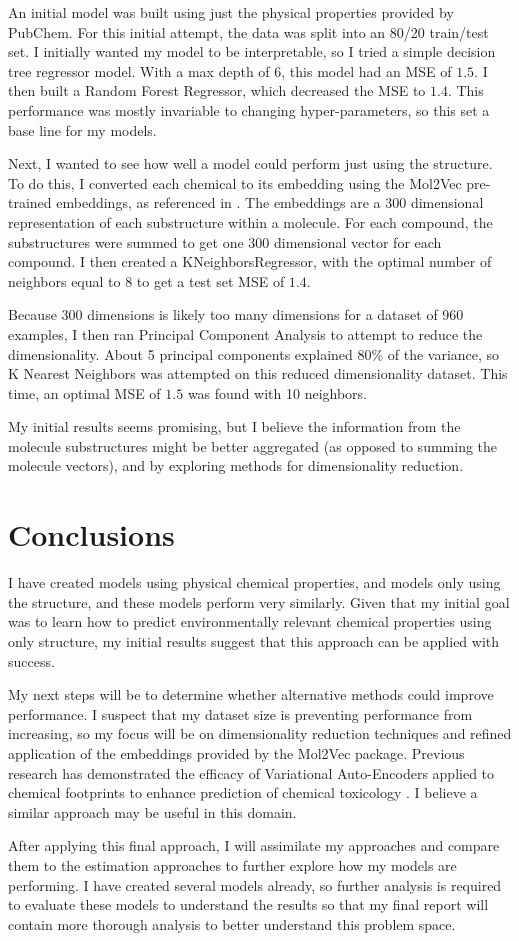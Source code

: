 \documentclass[12pt, oneside]{article}   	%
\begin{document}
An initial model was built using just the physical properties provided by PubChem. For this initial attempt, the data was split into an 80/20 train/test set. I initially wanted my model to be interpretable, so I tried a simple decision tree regressor model. With a max depth of 6, this model had an MSE of $1.5$. I then built a Random Forest Regressor, which decreased the MSE to $1.4$. This performance was mostly invariable to changing hyper-parameters, so this set a base line for my models.

Next, I wanted to see how well a model could perform just using the structure. To do this, I converted each chemical to its embedding using the Mol2Vec pre-trained embeddings, as referenced in \cite{jaeger2018}. The embeddings are a 300 dimensional representation of each substructure within a molecule. For each compound, the substructures were summed to get one 300 dimensional vector for each compound. I then created a KNeighborsRegressor, with the optimal number of neighbors equal to 8 to get a test set MSE of $1.4$. 

Because 300 dimensions is likely too many dimensions for a dataset of 960 examples, I then ran Principal Component Analysis to attempt to reduce the dimensionality. About 5 principal components explained 80\% of the variance, so K Nearest Neighbors was attempted on this reduced dimensionality dataset. This time, an optimal MSE of $1.5$ was found with 10 neighbors.

My initial results seems promising, but I believe the information from the molecule substructures might be better aggregated (as opposed to summing the molecule vectors), and by exploring methods for dimensionality reduction.

\section{Conclusions}
I have created models using physical chemical properties, and models only using the structure, and these models perform very similarly. Given that my initial goal was to learn how to predict environmentally relevant chemical properties using only structure, my initial results suggest that this approach can be applied with success.

My next steps will be to determine whether alternative methods could improve performance. I suspect that my dataset size is preventing performance from increasing, so my focus will be on dimensionality reduction techniques and refined application of the embeddings provided by the Mol2Vec package. Previous research has demonstrated the efficacy of Variational Auto-Encoders applied to chemical footprints to enhance prediction of chemical toxicology \cite{RN106}. I believe a similar approach may be useful in this domain.

After applying this final approach, I will assimilate my approaches and compare them to the estimation approaches to further explore how my models are performing. I have created several models already, so further analysis is required to evaluate these models to understand the results so that my final report will contain more thorough analysis to better understand this problem space.

{}

\end{document}
